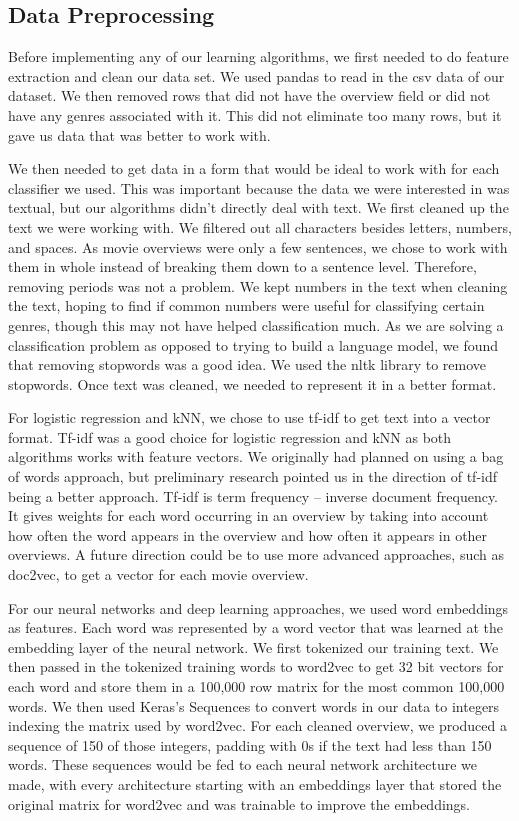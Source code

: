 \documentclass[sigconf]{acmart}
\begin{document}
\subsection{Data Preprocessing}
Before implementing any of our learning algorithms, we first needed to do feature extraction and clean our data set.  We used pandas to read in the csv data of our dataset.  We then removed rows that did not have the overview field or did not have any genres associated with it.  This did not eliminate too many rows, but it gave us data that was better to work with.

We then needed to get data in a form that would be ideal to work with for each classifier we used.  This was important because the data we were interested in was textual, but our algorithms didn't directly deal with text. We first cleaned up the text we were working with.  We filtered out all characters besides letters, numbers, and spaces. As movie overviews were only a few sentences, we chose to work with them in whole instead of breaking them down to a sentence level. Therefore, removing periods was not a problem.  We kept numbers in the text when cleaning the text, hoping to find if common numbers were useful for classifying certain genres, though this may not have helped classification much.  As we are solving a classification problem as opposed to trying to build a language model, we found that removing stopwords was a good idea. We used the nltk library to remove stopwords. Once text was cleaned, we needed to represent it in a better format. 

For logistic regression and kNN, we chose to use tf-idf to get text into a vector format. Tf-idf was a good choice for logistic regression and kNN as both algorithms works with feature vectors. We originally had planned on using a bag of words approach, but preliminary research pointed us in the direction of tf-idf being a better approach.
Tf-idf is term frequency -- inverse document frequency.  It gives weights for each word occurring in an overview by taking into account how often the word appears in the overview and how often it appears in other overviews. A future direction could be to use more advanced approaches, such as doc2vec, to get a vector for each movie overview.  

For our neural networks and deep learning approaches, we used word embeddings as features.  Each word was represented by a word vector that was learned at the embedding layer of the neural network.  We first tokenized our training text. We then passed in the tokenized training words to word2vec to get 32 bit vectors for each word and store them in a 100,000 row matrix for the most common 100,000 words.  We then used Keras's Sequences to convert words in our data to integers indexing the matrix used by word2vec.  For each cleaned overview, we produced a sequence of 150 of those integers, padding with 0s if the text had less than 150 words. These sequences would be fed to each neural network architecture we made, with every architecture starting with an embeddings layer that stored the original matrix for word2vec and was trainable to improve the embeddings. 
\end{document}
